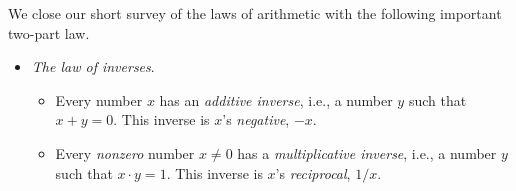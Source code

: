 We close our short survey of the laws of arithmetic with the following
important two-part law.
\begin{itemize}
\item
{\it The law of inverses}.
%
  \begin{itemize}
  \item
Every number $x$ has an {\em additive inverse},
i.e., a number $y$ such that $x+y =0$.  This inverse is $x$'s {\it
  negative}, $-x$.
  \item
Every {\em nonzero} number $x \neq 0$ has a {\em multiplicative
  inverse}, i.e., a number $y$ such that
$x \cdot y = 1$.  This inverse is $x$'s {\it reciprocal},
$1/x$.
  \end{itemize}
\end{itemize}


